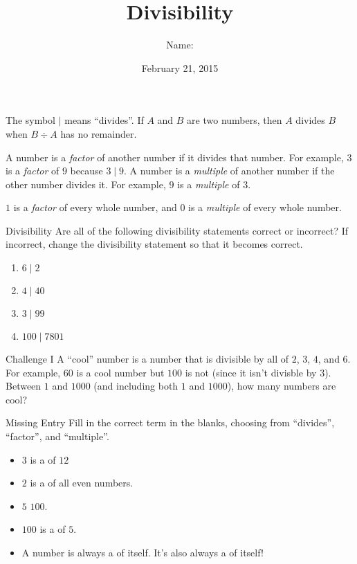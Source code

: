 \documentclass[12pt,letterpaper]{article}
\title{Divisibility}
\author{Name: \underline{\hspace{5cm}}}
\date{February 21, 2015}
\begin{document}
\maketitle

\thispagestyle{empty}

The symbol $\mid$ means ``divides''. If $A$ and $B$ are
two numbers, then $A$ divides $B$ when $B \div A$ has
no remainder.

A number is a \emph{factor} of another number if it divides
that number. For example, $3$ is a \emph{factor} of $9$
because $3 \mid 9$. A number is a \emph{multiple} of
another number if the other number divides it. For example,
$9$ is a \emph{multiple} of $3$.

$1$ is a \emph{factor} of every whole number, and $0$ is
a \emph{multiple} of every whole number.

\begin{problem}{Divisibility}
 Are all of the following divisibility statements correct or incorrect? If
 incorrect, change the divisibility statement so that it becomes correct.

 \begin{enumerate}
  \item $6 \mid 2$
  \item $4 \mid 40$
  \item $3 \mid 99$
  \item $100 \mid 7801$
 \end{enumerate}

\end{problem}

\begin{problem}{Challenge I}
 A ``cool'' number is a number that is divisible by all of $2$, $3$, $4$, and
 $6$. For example, $60$ is a cool number but $100$ is not (since it isn't
 divisble by $3$). Between $1$ and $1000$ (and including both $1$ and $1000$),
 how many numbers are cool?
\end{problem}

\begin{problem}{Missing Entry}
Fill in the correct term in the blanks, choosing from
``divides'', ``factor'', and ``multiple''.

\begin{itemize}
 \item $3$ is a \underline{\hspace{10em}} of $12$
 \item $2$ is a \underline{\hspace{10em}} of all even
 numbers.
 \item $5$ \underline{\hspace{10em}} $100$.
 \item $100$ is a \underline{\hspace{10em}} of $5$.
 \item A number is always a \underline{\hspace{10em}} of
 itself. It's also always a \underline{\hspace{10em}} of
 itself!
\end{itemize}
\end{problem}
\end{document}
